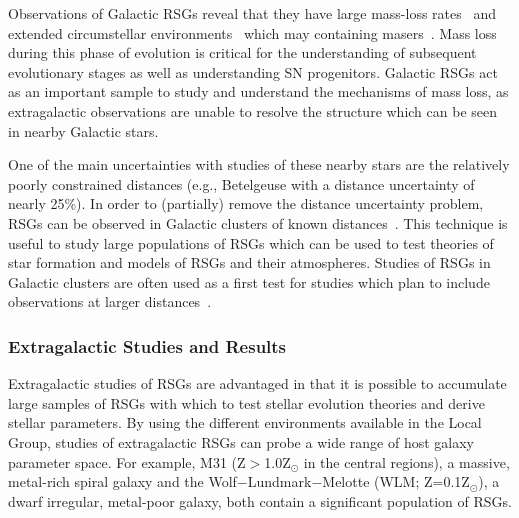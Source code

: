 Observations of Galactic RSGs reveal that they have large mass-loss rates~\citep[10$^{-(6\pm 1)}$M$_{\odot}$yr$^{-1}$;][]{Danchi94, Richards13} and extended circumstellar environments~\citep{Smith01} which may containing masers~\citep{Schuster06}.
Mass loss during this phase of evolution is critical for the understanding of subsequent evolutionary stages as well as understanding SN progenitors.
Galactic RSGs act as an important sample to study and understand the mechanisms of mass loss, as extragalactic observations are unable to resolve the structure which can be seen in nearby Galactic stars.

One of the main uncertainties with studies of these nearby stars are the relatively poorly constrained distances (e.g., Betelgeuse with a distance uncertainty of nearly 25\%).
In order to (partially) remove the distance uncertainty problem, RSGs can be observed in Galactic clusters of known distances~\citep[e.g.][]{Humphreys78, Mel'Nik95}.
This technique is useful to study large populations of RSGs which can be used to test theories of star formation and models of RSGs and their atmospheres.
Studies of RSGs in Galactic clusters are often used as a first test for studies which plan to include observations at larger distances~\citep[e.g.][]{Levesque05,Levesque06, 2010MNRAS.407.1203D,2013ApJ...767....3D}.

\subsubsection{Extragalactic Studies and Results}\label{extragalactic RSGs}

Extragalactic studies of RSGs are advantaged in that it is possible to accumulate large samples of RSGs with which to test stellar evolution theories and derive stellar parameters.
By using the different environments available in the Local Group, studies of extragalactic RSGs can probe a wide range of host galaxy parameter space.
For example, M31 (Z$>$1.0Z$_{\odot}$ in the central regions), a massive, metal-rich spiral galaxy and the Wolf$-$Lundmark$-$Melotte (WLM; Z=0.1Z$_{\odot}$), a dwarf irregular, metal-poor galaxy, both contain a significant population of RSGs.

